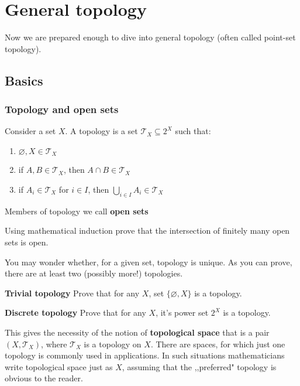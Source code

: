 %
%
%

\chapter{General topology}
\label{general_topology}
Now we are prepared enough to dive into general topology (often called point-set topology).

\section{Basics}
\subsection{Topology and open sets}
Consider a set $X$. A topology is a set $\mathcal{T}_X \subseteq 2^X $ such that:
\begin{enumerate}
	\item $\varnothing, X\in \mathcal{T}_X$
	\item if $A, B\in \mathcal{T}_X$, then $A\cap B\in \mathcal{T}_X$
	\item if $A_i\in \mathcal{T}_X$ for $i\in I$, then $\bigcup_{i\in I} A_i\in \mathcal T_X$
\end{enumerate}
Members of topology we call \textbf{open sets}

\begin{prob}
	Using mathematical induction prove that the intersection of finitely many open sets is open.
\end{prob}

You may wonder whether, for a given set, topology is unique. As you can prove, there are at least two (possibly more!) topologies.

\begin{prob}
	\textbf{Trivial topology} Prove that for any $X$, set $\{\varnothing, X\}$ is a topology.
\end{prob}

\begin{prob}
	\textbf{Discrete topology} Prove that for any $X$, it's power set $2^X$ is a topology.
\end{prob}

\noindent This gives the necessity of the notion of \textbf{topological space} that is a pair $(X,\mathcal T_X)$, where $\mathcal T_X$ is a topology on 
$X$. There are spaces, for which just one topology is commonly used in applications. In such situations mathematicians write topological space just as
$X$, assuming that the ,,preferred" topology is obvious to the reader. 

